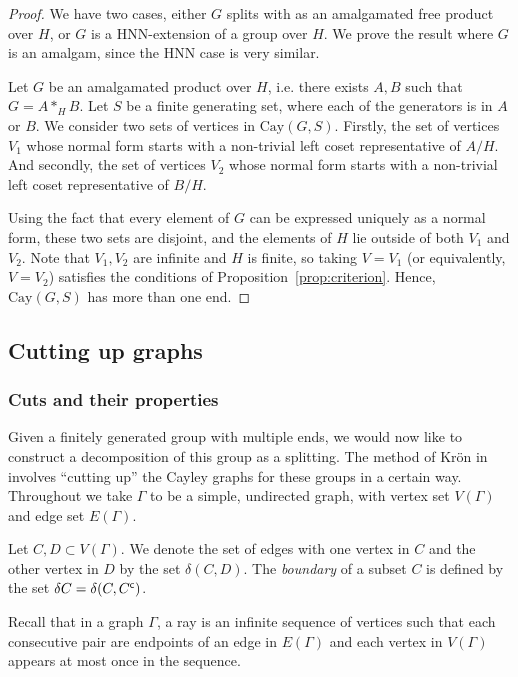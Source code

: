 \begin{proof}
    We have two cases, either \(G\) splits with as an amalgamated free product over \(H\), or \(G\) is a HNN-extension of a group over \(H\). We prove the result where \(G\) is an amalgam, since the HNN case is very similar.

    Let \(G\) be an amalgamated product over \(H\), i.e. there exists \(A,B\) such that \(G = A *_H B\).
    Let \(S\) be a finite generating set, where each of the generators is in \(A\) or \(B\). We consider two sets of vertices in \(\mathrm{Cay}(G,S)\). Firstly, the set of vertices \(V_1\) whose normal form starts with a non-trivial left coset representative of \(A/H\). And secondly, the set of vertices \(V_2\) whose normal form starts with a non-trivial left coset representative of \(B/H\).
    
    Using the fact that every element of \(G\) can be expressed uniquely as a normal form, these two sets are disjoint, and the elements of \(H\) lie outside of both \(V_1\) and \(V_2\). Note that \(V_1, V_2\) are infinite and \(H\) is finite, so taking \(V=V_1\) (or equivalently, \(V=V_2\)) satisfies the conditions of Proposition~\ref{prop:criterion}. Hence, \(\mathrm{Cay}(G,S)\) has more than one end.
\end{proof}

\subsection{Cutting up graphs}
\subsubsection{Cuts and their properties}
Given a finitely generated group with multiple ends, we would now like to construct a decomposition of this group as a splitting. The method of Kr{\"o}n in \cite{K10} involves ``cutting up'' the Cayley graphs for these groups in a certain way. Throughout we take \(\Gamma\) to be a simple, undirected graph, with vertex set \(V(\Gamma)\) and edge set \(E(\Gamma)\).

\begin{definition}
    Let \(C,D \subset V(\Gamma)\). We denote the set of edges with one vertex in \(C\) and the other vertex in \(D\) by the set \(\delta(C,D)\). The \emph{boundary} of a subset \(C\) is defined by the set \(\delta C = \delta(C, {C}^{\mathsf{c}})\).
\end{definition}

Recall that in a graph \(\Gamma\), a ray is an infinite sequence of vertices such that each consecutive pair are endpoints of an edge in \(E(\Gamma)\) and each vertex in \(V(\Gamma)\) appears at most once in the sequence.

